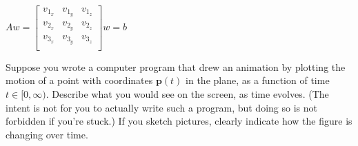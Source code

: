 \documentclass[addpoints]{exam}
\newcommand{\bp}{\mathbf{p}}
\begin{document}
\begin{questions}
\begin{parts}
$Aw = \begin{bmatrix}
    v_{1_x} & v_{1_y} & v_{1_z} \\
    v_{2_x} & v_{2_y} & v_{2_z}\\
    v_{3_x} & v_{3_y} & v_{3_z}\\
\end{bmatrix}w = b$ 



\end{parts}

\newpage
\question
Suppose you wrote a computer program that drew an animation by plotting the motion
of a point with coordinates $\bp(t)$ in the plane, as a function of time $t\in [0,\infty).$ Describe what you would see on the screen, as time evolves. (The intent is
not for you to actually write such a program, but doing so is not forbidden if
you're stuck.) If you sketch pictures, clearly indicate how the figure is changing
over time.

\end{questions}
\end{document}
